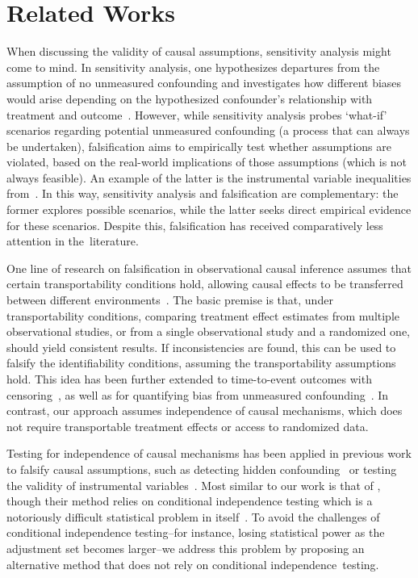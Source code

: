 \section{Related Works}
When discussing the validity of causal assumptions, sensitivity analysis might come to mind. In sensitivity analysis, one hypothesizes departures from the assumption of no unmeasured confounding and investigates how different biases would arise depending on the hypothesized confounder's relationship with treatment and outcome~\citep{cornfield1959smoking, tan2006distributional, vanderweele2017sensitivity}. However, while sensitivity analysis probes `what-if' scenarios regarding potential unmeasured confounding (a process that can always be undertaken), falsification aims to empirically test whether assumptions are violated, based on the real-world implications of those assumptions (which is not always feasible). An example of the latter is the instrumental variable inequalities from~\citet{pearl1995testability}. In this way, sensitivity analysis and falsification are complementary: the former explores possible scenarios, while the latter seeks direct empirical evidence for these scenarios. Despite this, falsification has received comparatively less attention in the~literature.

One line of research on falsification in observational causal inference assumes that certain transportability conditions hold, allowing causal effects to be transferred between different environments~\citep{dahabreh2020benchmarking,hussain2022falsification,hussain2023falsification}. The basic premise is that, under transportability conditions, comparing treatment effect estimates from multiple observational studies, or from a single observational study and a randomized one, should yield consistent results. If inconsistencies are found, this can be used to falsify the identifiability conditions, assuming the transportability assumptions hold. This idea has been further extended to time-to-event outcomes with censoring~\citep{demirel2024benchmarking}, as well as for quantifying bias from unmeasured confounding~\citep{de2024detecting, de2024hidden}. In contrast, our approach assumes independence of causal mechanisms, which does not require transportable treatment effects or access to randomized data. 

Testing for independence of causal mechanisms has been applied in previous work to falsify causal assumptions, such as detecting hidden confounding~\citep{karlsson2023detecting} or testing the validity of instrumental variables~\citep{burauel2023evaluating}. Most similar to our work is that of \citet{karlsson2023detecting}, though their method relies on conditional independence testing which is a notoriously difficult statistical problem in itself~\citep{shah2020hardness}. To avoid the challenges of conditional independence testing--for instance, losing statistical power as the adjustment set becomes larger--we address this problem by proposing an alternative method that does not rely on conditional independence~testing.


